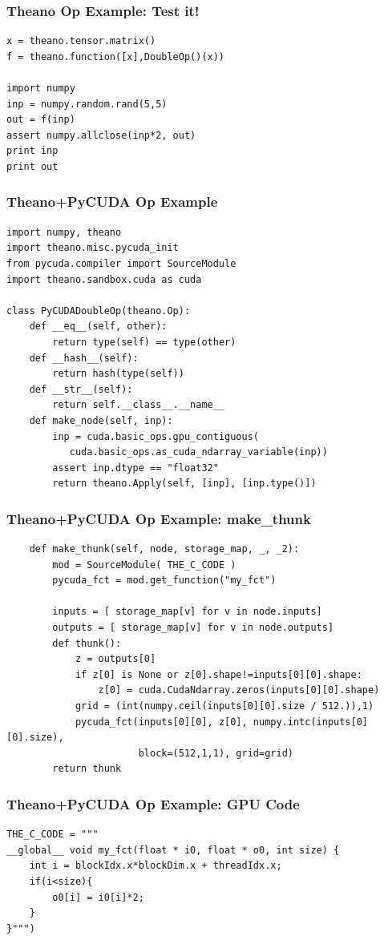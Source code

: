 \documentclass[a4paper,9pt]{beamer}
\begin{document}
\begin{frame}[fragile]
\frametitle{Theano Op Example: Test it!}
\begin{Verbatim}
x = theano.tensor.matrix()
f = theano.function([x],DoubleOp()(x))

import numpy
inp = numpy.random.rand(5,5)
out = f(inp)
assert numpy.allclose(inp*2, out)
print inp
print out
\end{Verbatim}
\end{frame}

\begin{frame}[fragile]
\frametitle{Theano+PyCUDA Op Example}
\begin{Verbatim}
import numpy, theano
import theano.misc.pycuda_init
from pycuda.compiler import SourceModule
import theano.sandbox.cuda as cuda

class PyCUDADoubleOp(theano.Op):
    def __eq__(self, other):
        return type(self) == type(other)
    def __hash__(self):
        return hash(type(self))
    def __str__(self):
        return self.__class__.__name__
    def make_node(self, inp):
        inp = cuda.basic_ops.gpu_contiguous(
           cuda.basic_ops.as_cuda_ndarray_variable(inp))
        assert inp.dtype == "float32"
        return theano.Apply(self, [inp], [inp.type()])
\end{Verbatim}
\end{frame}


\begin{frame}[fragile]
\frametitle{Theano+PyCUDA Op Example: make\_thunk}
\begin{Verbatim}
    def make_thunk(self, node, storage_map, _, _2):
        mod = SourceModule( THE_C_CODE )
        pycuda_fct = mod.get_function("my_fct")

        inputs = [ storage_map[v] for v in node.inputs]
        outputs = [ storage_map[v] for v in node.outputs]
        def thunk():
            z = outputs[0]
            if z[0] is None or z[0].shape!=inputs[0][0].shape:
                z[0] = cuda.CudaNdarray.zeros(inputs[0][0].shape)
            grid = (int(numpy.ceil(inputs[0][0].size / 512.)),1)
            pycuda_fct(inputs[0][0], z[0], numpy.intc(inputs[0][0].size),
                       block=(512,1,1), grid=grid)
        return thunk
\end{Verbatim}
\end{frame}

\begin{frame}[fragile]
\frametitle{Theano+PyCUDA Op Example: GPU Code}
\begin{Verbatim}
THE_C_CODE = """
__global__ void my_fct(float * i0, float * o0, int size) {
    int i = blockIdx.x*blockDim.x + threadIdx.x;
    if(i<size){
        o0[i] = i0[i]*2;
    }
}""")
\end{Verbatim}
\end{frame}
\end{document}
